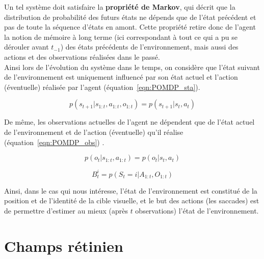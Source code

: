 Un tel système doit satisfaire la \textbf{propriété de Markov}, qui décrit que la distribution de probabilité des futurs états ne dépends que de l'état précédent et pas de toute la séquence d'états en amont. Cette propriété retire donc de l'agent la notion de mémoire à long terme (ici correspondant à tout ce qui a pu se dérouler avant $t_{-1}$) des états précédents de l'environnement, mais aussi des actions et des observations réalisées dans le passé. \autocite{Butko2010}\\
Ainsi lors de l'évolution du système dans le temps, on considère que l'état suivant de l'environnement est uniquement influencé par son état actuel et l'action (éventuelle) réalisée par l'agent (équation~\ref{eqn:POMDP_sta}). \autocite{Butko2010, Potthast2016} 

\begin{equation}
p(s_{t+1}|s_{1:t},a_{1:t},o_{1:t}) = p(s_{t+1}|s_{t},a_{t})
\label{eqn:POMDP_sta}
\end{equation}

De même, les observations actuelles de l'agent ne dépendent que de l'état actuel de l'environnement et de l'action (éventuelle) qu'il réalise (équation~\ref{eqn:POMDP_obs}) \autocite{Butko2010}.

\begin{equation}
p(o_{t}|s_{1:t},a_{1:t}) = p(o_{t}|s_{t},a_{t})
\label{eqn:POMDP_obs}
\end{equation}

\begin{equation}
B_{t}^i = p(S_{t} = i|A_{1:t},O_{1:t})
\label{eqn:POMDP_bel}
\end{equation}

Ainsi, dans le cas qui nous intéresse, l'état de l'environnement est constitué de la position et de l'identité de la cible visuelle, et le but des actions (les saccades) est de permettre d'estimer au mieux (après $t$ observations) l'état de l'environnement.


\section{Champs rétinien} %

